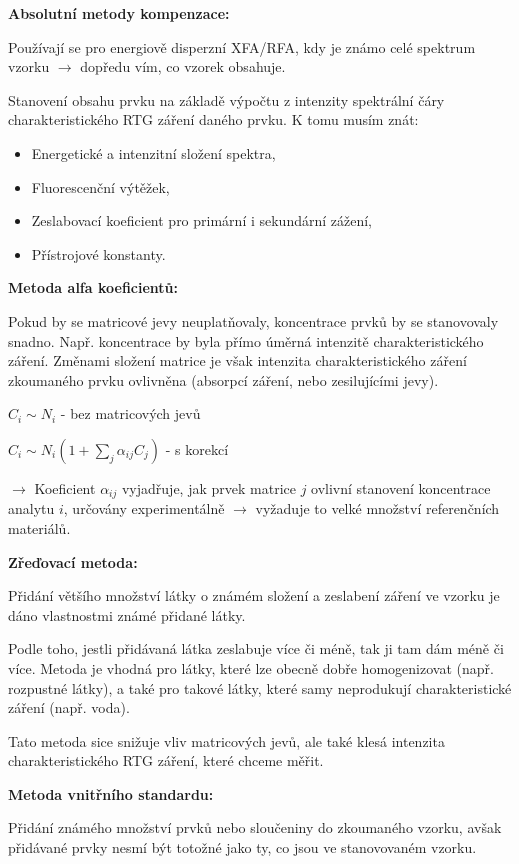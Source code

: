 \textbf{Absolutní metody kompenzace:}

Používají se pro energiově disperzní XFA/RFA, kdy je známo celé spektrum vzorku $\rightarrow$ dopředu vím, co vzorek obsahuje.

Stanovení obsahu prvku na základě výpočtu z intenzity spektrální čáry charakteristického RTG záření daného prvku. K tomu musím znát:

\begin{itemize}
    \item Energetické a intenzitní složení spektra,
    \item Fluorescenční výtěžek,
    \item Zeslabovací koeficient pro primární i sekundární zážení,
    \item Přístrojové konstanty.
\end{itemize}

\textbf{Metoda alfa koeficientů:}

Pokud by se matricové jevy neuplatňovaly, koncentrace prvků by se stanovovaly snadno. Např. koncentrace by byla přímo úměrná intenzitě charakteristického záření. Změnami složení matrice je však intenzita charakteristického záření zkoumaného prvku ovlivněna (absorpcí záření, nebo zesilujícími jevy).
	
	$C_i \sim  N_i$ - bez matricových jevů
	
	$C_i \sim N_i(1+\sum_{j}\alpha_{ij}C_j)$ - s korekcí
	
	$\rightarrow$ Koeficient $\alpha_{ij}$ vyjadřuje, jak prvek matrice $j$ ovlivní stanovení koncentrace analytu $i$, určovány experimentálně $\rightarrow$ vyžaduje to velké množství referenčních materiálů.

\textbf{Zřeďovací metoda:}

Přidání většího množství látky o známém složení a zeslabení záření ve vzorku je dáno vlastnostmi známé přidané látky. 

Podle toho, jestli přidávaná látka zeslabuje více či méně, tak ji tam dám méně či více. Metoda je vhodná pro látky, které lze obecně dobře homogenizovat (např. rozpustné látky), a také pro takové látky, které samy neprodukují charakteristické záření (např. voda).

Tato metoda sice snižuje vliv matricových jevů, ale také klesá intenzita charakteristického RTG záření, které chceme měřit.

\textbf{Metoda vnitřního standardu:}

Přidání známého množství prvků nebo sloučeniny do zkoumaného vzorku, avšak přidávané prvky nesmí být totožné jako ty, co jsou ve stanovovaném vzorku. 

